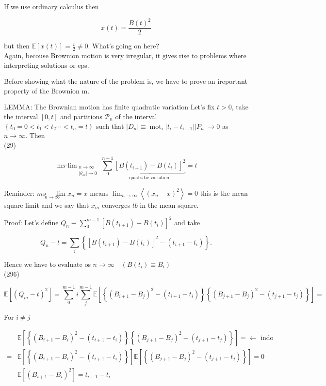 \documentclass[10pt]{article}
\begin{document}
If we use ordinary calculus then

$$
x(t)=\frac{B(t)^{2}}{2}
$$

but then $\mathbb{E}[x(t)]=\frac{t}{2} \neq 0$. What's going on here?\\
Again, becouse Brownion motion is very irregular, it gives rise to problems where interpreting solutions or eps.

Before showing what the nature of the problem is, we have to prove an ireportant property of the Brownion m.

LEMMA: The Brownian motion has finite quadratic variation Let's fix $t>0$, take the interval $[0, t]$ and partitions $\mathcal{P}_{n}$ of the interval $\left\{t_{0}=0<t_{1}<t_{2} \cdots<t_{n}=t\right\}$ such that $\left|D_{n}\right| \equiv \operatorname{mot}_{i}\left|t_{i}-t_{i-1}\right| \left|P_{n}\right| \rightarrow 0$ as $n \rightarrow \infty$. Then\\
(29)

$$
\operatorname{ms-lim}_{\substack{n \rightarrow \infty \\\left|\theta_{m}\right| \rightarrow 0}} \sum_{0}^{n-1} \underbrace{\left[B\left(t_{i+1}\right)-B\left(t_{i}\right)\right]^{2}}_{\text {quadratic variation }}=t
$$

Reminder: $\underset{n \rightarrow \infty}{m s-\lim } x_{n}=x$ means $\lim _{n \rightarrow \infty}\left\langle\left(x_{n}-x\right)^{2}\right\rangle=0$ this is the mean square limit and we say that $x_{m}$ converges $t b$ in the mean square.

Proof: Let's define $Q_{n} \equiv \sum_{0}^{m-1}\left[B\left(t_{i+1}\right)-B\left(t_{i}\right)\right]^{2}$ and take

$$
Q_{n}-t=\sum_{i}\left\{\left[B\left(t_{i+1}\right)-B\left(t_{i}\right)\right]^{2}-\left(t_{i+1}-t_{i}\right)\right\} .
$$

Hence we have to evaluate os $n \rightarrow \infty \quad\left(B\left(t_{i}\right) \equiv B_{i}\right)$\\
(296)

$$
\mathbb{E}\left[\left(Q_{m}-t\right)^{2}\right]=\sum_{0}^{m-1} i \sum_{j}^{m-1} \mathbb{E}\left[\left\{\left(B_{i+1}-B_{j}\right)^{2}-\left(t_{i+1}-t_{i}\right)\right\}\left\{\left(B_{j+1}-B_{j}\right)^{2}-\left(t_{j+1}-t_{j}\right)\right\}\right]=
$$

For $i \neq j$

$$
\begin{aligned}
& \mathbb{E}\left[\left\{\left(B_{i+1}-B_{i}\right)^{2}-\left(t_{i+1}-t_{i}\right)\right\}\left\{\left(B_{j+1}-B_{j}\right)^{2}-\left(t_{j+1}-t_{j}\right)\right\}\right]=\leftarrow \text { indo } \\
= & \mathbb{E}\left[\left\{\left(B_{i+1}-B_{i}\right)^{2}-\left(t_{i+1}-t_{i}\right)\right\}\right] \mathbb{E}\left[\left\{\left(B_{j+1}-B_{j}\right)^{2}-\left(t_{j+1}-t_{j}\right)\right\}\right]=0 \\
& \mathbb{E}\left[\left(B_{i+1}-B_{i}\right)^{2}\right]=t_{i+1}-t_{i}
\end{aligned}
$$
\end{document}
